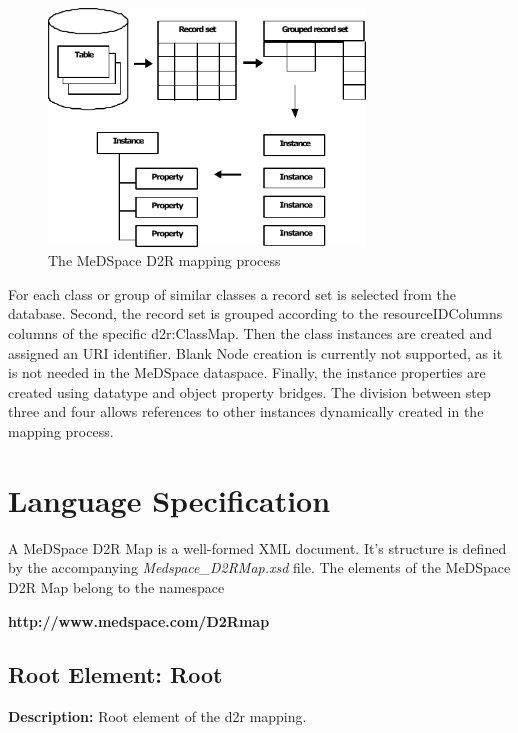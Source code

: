 \begin{figure}[H]
	\begin{center}
		\includegraphics [width=0.75\textwidth]{../images/MappingProcess.pdf}
	\end{center}
	\caption{The MeDSpace D2R mapping process}
	\label{MappingProcessFigure}
\end{figure}

For each class or group of similar classes a record set is selected from the
database. Second, the record set is grouped according to the resourceIDColumns columns of
the specific d2r:ClassMap. Then the class instances are created and assigned an URI identifier. Blank Node creation is currently not supported, as it is not needed in the MeDSpace dataspace. Finally, the instance properties are created using
datatype and object property bridges.
The division between step three and four allows references to other instances dynamically created in the mapping process.

\chapter{Language Specification}

A MeDSpace D2R Map is a well-formed XML document. It's structure is defined by the accompanying \textit{Medspace{\_}D2RMap.xsd} file. The elements of the MeDSpace D2R Map belong to the namespace
\begin{center}
	\textbf{http://www.medspace.com/D2Rmap}
\end{center}

\section{Root Element: Root}
\textbf{Description:} \newline
Root element of the d2r mapping.

